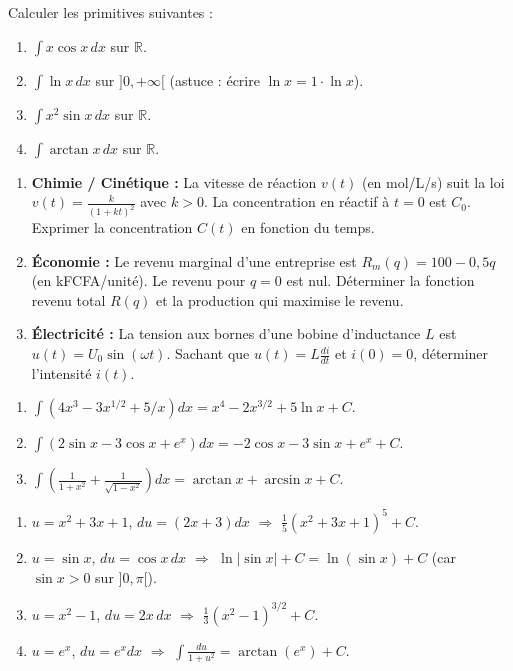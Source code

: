 \documentclass[11pt]{article}
\begin{document}
\begin{exercice}
Calculer les primitives suivantes :
\begin{enumerate}
    \item $\displaystyle \int x \cos x \, dx$ sur $\mathbb{R}$.
    \item $\displaystyle \int \ln x \, dx$ sur $]0,+\infty[$ (astuce : écrire $\ln x = 1 \cdot \ln x$).
    \item $\displaystyle \int x^2 \sin x \, dx$ sur $\mathbb{R}$.
    \item $\displaystyle \int \arctan x \, dx$ sur $\mathbb{R}$.
\end{enumerate}
\end{exercice}

\begin{exercice}
\begin{enumerate}
    \item \textbf{Chimie / Cinétique :} La vitesse de réaction $v(t)$ (en mol/L/s) suit la loi $v(t) = \frac{k}{(1+kt)^2}$ avec $k>0$. La concentration en réactif à $t=0$ est $C_0$. Exprimer la concentration $C(t)$ en fonction du temps.
    \item \textbf{Économie :} Le revenu marginal d'une entreprise est $R_m(q) = 100 - 0,5q$ (en kFCFA/unité). Le revenu pour $q=0$ est nul. Déterminer la fonction revenu total $R(q)$ et la production qui maximise le revenu.
    \item \textbf{Électricité :} La tension aux bornes d'une bobine d'inductance $L$ est $u(t) = U_0 \sin(\omega t)$. Sachant que $u(t) = L \frac{di}{dt}$ et $i(0)=0$, déterminer l'intensité $i(t)$.
\end{enumerate}
\end{exercice}

\begin{corrige}[Entraînement 1]
\begin{enumerate}
    \item $\int (4x^3 - 3x^{1/2} + 5/x) dx = x^4 - 2x^{3/2} + 5\ln x + C$.
    \item $\int (2\sin x - 3\cos x + e^x) dx = -2\cos x - 3\sin x + e^x + C$.
    \item $\int \left(\frac{1}{1+x^2} + \frac{1}{\sqrt{1-x^2}}\right) dx = \arctan x + \arcsin x + C$.
\end{enumerate}
\end{corrige}

\begin{corrige}[Entraînement 2]
\begin{enumerate}
    \item $u=x^2+3x+1$, $du=(2x+3)dx$ $\Rightarrow$ $\frac{1}{5}(x^2+3x+1)^5 + C$.
    \item $u=\sin x$, $du=\cos x\,dx$ $\Rightarrow$ $\ln|\sin x| + C = \ln(\sin x) + C$ (car $\sin x>0$ sur $]0,\pi[$).
    \item $u=x^2-1$, $du=2x\,dx$ $\Rightarrow$ $\frac{1}{3}(x^2-1)^{3/2} + C$.
    \item $u=e^x$, $du=e^x dx$ $\Rightarrow$ $\int \frac{du}{1+u^2} = \arctan(e^x) + C$.
\end{enumerate}
\end{corrige}
\end{document}
